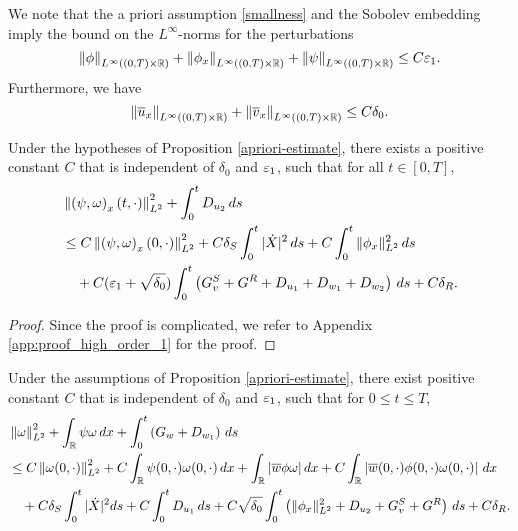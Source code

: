 \documentclass[11pt,reqno]{amsart}
\begin{document}
We note that the a priori assumption \eqref{smallness} and the Sobolev embedding imply the bound on the $L^\infty$-norms for the perturbations
\begin{equation} \label{eq: L^infty bounds}
	\left\lVert\phi\right\rVert_{L^\infty((0,T)\times\mathbb{R})}+\left\lVert\phi_x\right\rVert_{L^\infty((0,T)\times\mathbb{R})}+\left\lVert\psi\right\rVert_{L^\infty((0,T)\times\mathbb{R})} \le C \varepsilon_1.
\end{equation}
Furthermore, we have
\begin{equation} \label{eq: L^infty bounds-2}
\left\lVert\overline{u}_x\right\rVert_{L^\infty((0,T)\times\mathbb{R})}+\left\lVert\overline{v}_x\right\rVert_{L^\infty((0,T)\times\mathbb{R})} \le C \delta_0.
\end{equation}

	
\begin{lemma} \label{lem: est-0}Under the hypotheses of Proposition \ref{apriori-estimate}, there exists a positive constant $C$ that is independent of $\delta_0$ and $\varepsilon_1$, such that for all $t \in [0,T],$
\begin{equation} \label{eq: est-0}
\begin{aligned}
	&\left\lVert \left(\psi, \omega \right)_x(t,\cdot)\right\rVert_{L^2}^2+  \int_0^t D_{u_2} \, d s \\
	&\le C \left\lVert  \left( \psi,\omega\right)_x(0,\cdot)\right\rVert_{L^2}^2+C\delta_S \int_0^t |\dot{X}|^2 \, d s + C \int_0^t \| \phi_x\|_{L^2}^2 \, d s \\ 
	& \quad +C (\varepsilon_1+\sqrt{\delta_0})\int_0^t  \left( G^S_v+G^R  + D_{u_1}+D_{w_1} + D_{w_2} \right) \, d s +C \delta_R.
\end{aligned}
\end{equation}
\end{lemma}
\begin{proof}
	Since the proof is complicated, we refer to Appendix \ref{app:proof_high_order_1} for the proof.
\end{proof}
	
\begin{lemma}\label{lem: est-1}
Under the assumptions of Proposition \ref{apriori-estimate}, there exist positive constant $C$ that is independent of $\delta_0$ and $\varepsilon_1$, such that for $0 \le t \le T$,
\begin{equation} \label{eq: est-1}
\begin{aligned}
&\left\lVert\omega\right\rVert_{L^2}^2+  \int_\mathbb{R} \psi\omega \, dx  +  \int_0^t \left(G_w + D_{w_1} \right) \, d s \\ 
&\le  C \left\lVert\omega(0,\cdot)\right\rVert_{L^2}^2 + C \int_\mathbb{R} \psi(0,\cdot)\omega(0,\cdot) \, dx + \int_\mathbb{R} | \overline{w} \phi \omega |\, dx + C \int_\mathbb{R} \left|  \overline{w}(0,\cdot) \phi(0,\cdot)\omega(0,\cdot) \right|\, dx \\
& \quad + C \delta_S \int_0^t | \dot{X}|^2 ds + C \int_0^t D_{u_1} \, d s +C \sqrt{\delta_0} \int_0^t \left( \| \phi_x \|_{L^2}^2 + D_{u_2} + G^S_v +G^R \right) \, d s +C \delta_R.
\end{aligned}
\end{equation}
\end{lemma}
	
\end{document}
